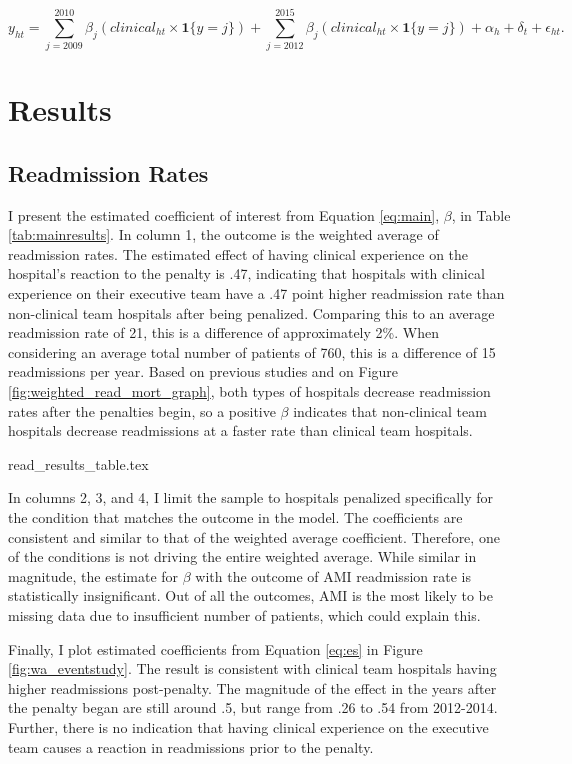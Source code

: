 \documentclass[12pt]{article}
\begin{document}
    \begin{equation}
    \label{eq:es}
    y_{ht} = \sum_{j=2009}^{2010}\beta_j(clinical_{ht} \times \mathbf{1}\{y=j\}) + \sum_{j=2012}^{2015}\beta_j (clinical_{ht} \times \mathbf{1}\{y=j\}) + \alpha_{h} + \delta_t + \epsilon_{ht}.
    \end{equation}

    \section{Results}

    \subsection{Readmission Rates}

    I present the estimated coefficient of interest from Equation \ref{eq:main}, $\beta$, in Table \ref{tab:mainresults}. In column 1, the outcome is the weighted average of readmission rates. The estimated effect of having clinical experience on the hospital's reaction to the penalty is .47, indicating that hospitals with clinical experience on their executive team have a .47 point higher readmission rate than non-clinical team hospitals after being penalized. Comparing this to an average readmission rate of 21, this is a difference of approximately 2\%. When considering an average total number of patients of 760, this is a difference of 15 readmissions per year. Based on previous studies and on Figure \ref{fig:weighted_read_mort_graph}, both types of hospitals decrease readmission rates after the penalties begin, so a positive $\beta$ indicates that non-clinical team hospitals decrease readmissions at a faster rate than clinical team hospitals. 

    {read_results_table.tex}
    
    In columns 2, 3, and 4, I limit the sample to hospitals penalized specifically for the condition that matches the outcome in the model. The coefficients are consistent and similar to that of the weighted average coefficient. Therefore, one of the conditions is not driving the entire weighted average. While similar in magnitude, the estimate for $\beta$ with the outcome of AMI readmission rate is statistically insignificant. Out of all the outcomes, AMI is the most likely to be missing data due to insufficient number of patients, which could explain this. 

    Finally, I plot estimated coefficients from Equation \ref{eq:es} in Figure \ref{fig:wa_eventstudy}. The result is consistent with clinical team hospitals having higher readmissions post-penalty. The magnitude of the effect in the years after the penalty began are still around .5, but range from .26 to .54 from 2012-2014. Further, there is no indication that having clinical experience on the executive team causes a reaction in readmissions prior to the penalty. 
\end{document}

